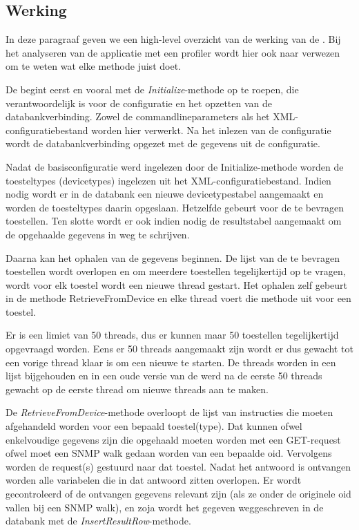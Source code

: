 \subsection{Werking}
\label{werking}

In deze paragraaf geven we een high-level overzicht van de werking van de \nwmretriever{}.
Bij het analyseren van de applicatie met een profiler wordt hier ook naar verwezen om te weten wat elke methode juist doet.

De \nwmretriever{} begint eerst en vooral met de \textit{Initialize}-methode op te roepen,
die verantwoordelijk is voor de configuratie en het opzetten van de databankverbinding.
Zowel de commandlineparameters als het XML-configuratiebestand worden hier verwerkt.
Na het inlezen van de configuratie wordt de databankverbinding opgezet met de gegevens uit de configuratie.

Nadat de basisconfiguratie werd ingelezen door de Initialize-methode worden de toesteltypes (devicetypes) ingelezen uit het XML-configuratiebestand.
Indien nodig wordt er in de databank een nieuwe devicetypestabel aangemaakt en worden de toesteltypes daarin opgeslaan.
Hetzelfde gebeurt voor de te bevragen toestellen.
Ten slotte wordt er ook indien nodig de resultstabel aangemaakt om de opgehaalde gegevens in weg te schrijven.

Daarna kan het ophalen van de gegevens beginnen.
De lijst van de te bevragen toestellen wordt overlopen en om meerdere toestellen tegelijkertijd op te vragen,
wordt voor elk toestel wordt een nieuwe thread gestart.
Het ophalen zelf gebeurt in de methode RetrieveFromDevice en elke thread voert die methode uit voor een toestel.

Er is een limiet van 50 threads, dus er kunnen maar 50 toestellen tegelijkertijd opgevraagd worden.
Eens er 50 threads aangemaakt zijn wordt er dus gewacht tot een vorige thread klaar is om een nieuwe te starten.
De threads worden in een lijst bijgehouden en in een oude versie van de \nwmretriever{} werd na de eerste 50 threads gewacht op
de eerste thread om nieuwe threads aan te maken.

De \textit{RetrieveFromDevice}-methode overloopt de lijst van instructies die moeten afgehandeld worden voor een bepaald toestel(type).
Dat kunnen ofwel enkelvoudige gegevens zijn die opgehaald moeten worden met een GET-request ofwel moet een SNMP walk gedaan worden van een bepaalde \gls{oid}.
Vervolgens worden de request(s) gestuurd naar dat toestel.
Nadat het antwoord is ontvangen worden alle variabelen die in dat antwoord zitten overlopen.
Er wordt gecontroleerd of de ontvangen gegevens relevant zijn (als ze onder de originele \gls{oid} vallen bij een SNMP walk),
en zoja wordt het gegeven weggeschreven in de databank met de \textit{InsertResultRow}-methode.
